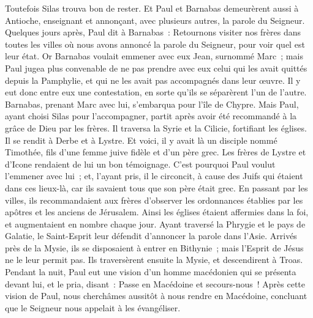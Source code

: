 \begin{multicols}{2}
Toutefois Silas trouva bon de rester.
Et Paul et Barnabas demeurèrent aussi à Antioche, enseignant et annonçant, avec plusieurs autres, la parole du Seigneur.
Quelques jours après, Paul dit à Barnabas~: Retournons visiter nos frères dans toutes les villes où nous avons annoncé la parole du Seigneur, pour voir quel est leur état.
Or Barnabas voulait emmener avec eux Jean, surnommé Marc~;
mais Paul jugea plus convenable de ne pas prendre avec eux celui qui les avait quittés depuis la Pamphylie, et qui ne les avait pas accompagnés dans leur œuvre.
Il y eut donc entre eux une contestation, en sorte qu'ils se séparèrent l'un de l'autre. Barnabas, prenant Marc avec lui, s'embarqua pour l'île de Chypre.
Mais Paul, ayant choisi Silas pour l'accompagner, partit après avoir été recommandé à la grâce de Dieu par les frères.
Il traversa la Syrie et la Cilicie, fortifiant les églises.
\VerseOne{}Il se rendit à Derbe et à Lystre. Et voici, il y avait là un disciple nommé Timothée, fils d'une femme juive fidèle et d'un père grec.
Les frères de Lystre et d'Icone rendaient de lui un bon témoignage.
C'est pourquoi Paul voulut l'emmener avec lui~; et, l'ayant pris, il le circoncit, à cause des Juifs qui étaient dans ces lieux-là, car ils savaient tous que son père était grec.
En passant par les villes, ils recommandaient aux frères d'observer les ordonnances établies par les apôtres et les anciens de Jérusalem.
Ainsi les églises étaient affermies dans la foi, et augmentaient en nombre chaque jour.
Ayant traversé la Phrygie et le pays de Galatie, le Saint-Esprit leur défendit d'annoncer la parole dans l'Asie.
Arrivés près de la Mysie, ils se disposaient à entrer en Bithynie~; mais l'Esprit de Jésus ne le leur permit pas.
Ils traversèrent ensuite la Mysie, et descendirent à Troas.
Pendant la nuit, Paul eut une vision d'un homme macédonien qui se présenta devant lui, et le pria, disant~: Passe en Macédoine et secours-nous~!
Après cette vision de Paul, nous cherchâmes aussitôt à nous rendre en Macédoine, concluant que le Seigneur nous appelait à les évangéliser.

\end{multicols}
